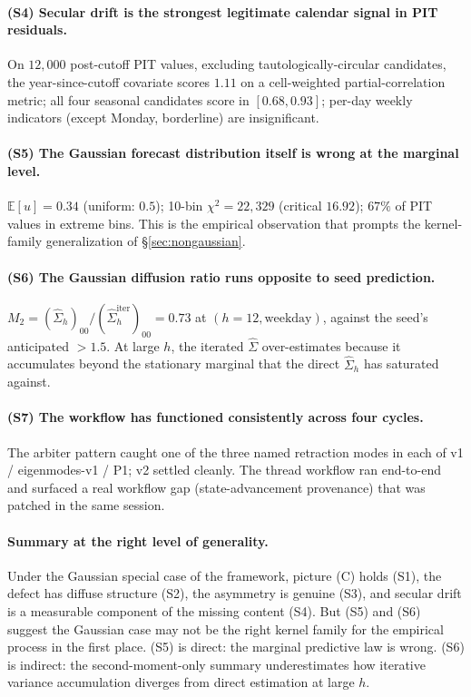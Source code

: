 \documentclass[11pt]{article}
\newcommand{\E}{\mathbb{E}}
\theoremstyle{definition}
\theoremstyle{plain}
\begin{document}
\paragraph{(S4) Secular drift is the strongest legitimate
calendar signal in PIT residuals.}
On $12{,}000$ post-cutoff PIT values, excluding tautologically-circular
candidates, the year-since-cutoff covariate scores $1.11$ on a
cell-weighted partial-correlation metric; all four seasonal candidates
score in $[0.68, 0.93]$; per-day weekly indicators (except Monday,
borderline) are insignificant.

\paragraph{(S5) The Gaussian forecast distribution itself is wrong
at the marginal level.}
$\E[u] = 0.34$ (uniform: $0.5$); 10-bin $\chi^2 = 22{,}329$ (critical
$16.92$); $67\%$ of PIT values in extreme bins. This is the
empirical observation that prompts the kernel-family generalization
of \S\ref{sec:nongaussian}.

\paragraph{(S6) The Gaussian diffusion ratio runs opposite to seed
prediction.}
$M_2 = (\hat\Sigma_h)_{00} / (\hat\Sigma_h^{\mathrm{iter}})_{00} = 0.73$
at $(h{=}12, \text{weekday})$, against the seed's anticipated
$> 1.5$. At large $h$, the iterated $\hat\Sigma$ over-estimates
because it accumulates beyond the stationary marginal that the
direct $\hat\Sigma_h$ has saturated against.

\paragraph{(S7) The workflow has functioned consistently across
four cycles.}
The arbiter pattern caught one of the three named retraction modes
in each of v1 / eigenmodes-v1 / P1; v2 settled cleanly. The thread
workflow ran end-to-end and surfaced a real workflow gap
(state-advancement provenance) that was patched in the same session.

\paragraph{Summary at the right level of generality.}
Under the Gaussian special case of the framework, picture (C)
holds (S1), the defect has diffuse structure (S2), the asymmetry
is genuine (S3), and secular drift is a measurable component of
the missing content (S4). But (S5) and (S6) suggest the Gaussian
case may not be the right kernel family for the empirical process
in the first place. (S5) is direct: the marginal predictive law
is wrong. (S6) is indirect: the second-moment-only summary
underestimates how iterative variance accumulation diverges from
direct estimation at large $h$.
\end{document}

